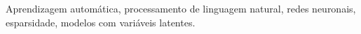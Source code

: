 \begin{palavraschave}
    Aprendizagem automática,
    processamento de linguagem natural,
    redes neuronais,
    esparsidade,
    modelos com variáveis latentes.
\end{palavraschave}
\clearpage
\thispagestyle{empty}
\cleardoublepage
